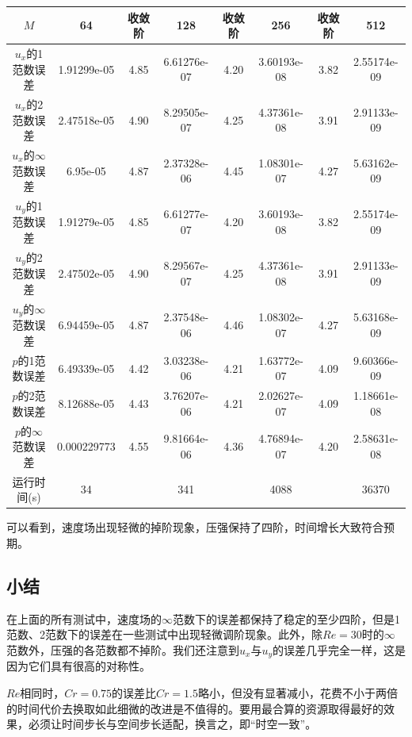 \documentclass[lang=cn,10pt,bibend=bibtex]{elegantbook}
\begin{document}
\begin{table}[H]
  \centering
  \small
  \begin{tabular}{c|ccccccc}
  \textbf{$M$}              & 64          & 收敛阶 & 128         & 收敛阶 & 256         & 收敛阶 & 512   \\ \hline
  $u_x$的1范数误差 & 1.91299e-05 & 4.85 & 6.61276e-07 & 4.20 & 3.60193e-08 & 3.82 & 2.55174e-09\\
  $u_x$的2范数误差 & 2.47518e-05 & 4.90 & 8.29505e-07 & 4.25 & 4.37361e-08 & 3.91 & 2.91133e-09\\
  $u_x$的$\infty$范数误差 & 6.95e-05 & 4.87 & 2.37328e-06 & 4.45 & 1.08301e-07 & 4.27 & 5.63162e-09\\
  $u_y$的1范数误差 & 1.91279e-05 & 4.85 & 6.61277e-07 & 4.20 & 3.60193e-08 & 3.82 & 2.55174e-09\\
  $u_y$的2范数误差 & 2.47502e-05 & 4.90 & 8.29567e-07 & 4.25 & 4.37361e-08 & 3.91 & 2.91133e-09\\
  $u_y$的$\infty$范数误差 & 6.94459e-05 & 4.87 & 2.37548e-06 & 4.46 & 1.08302e-07 & 4.27 & 5.63168e-09\\
  $p$的1范数误差 & 6.49339e-05 & 4.42 & 3.03238e-06 & 4.21 & 1.63772e-07 & 4.09 & 9.60366e-09\\
  $p$的2范数误差 & 8.12688e-05 & 4.43 & 3.76207e-06 & 4.21 & 2.02627e-07 & 4.09 & 1.18661e-08\\
  $p$的$\infty$范数误差 & 0.000229773 & 4.55 & 9.81664e-06 & 4.36 & 4.76894e-07 & 4.20 & 2.58631e-08\\  
  运行时间(s)                &       34     &       &     341      &       &     4088     &       &  36370
  \end{tabular}
\end{table}

可以看到，速度场出现轻微的掉阶现象，压强保持了四阶，时间增长大致符合预期。

\subsection{小结}

在上面的所有测试中，速度场的$\infty$范数下的误差都保持了稳定的至少四阶，但是1范数、2范数下的误差在一些测试中出现轻微调阶现象。此外，除$Re=30$时的$\infty$范数外，压强的各范数都不掉阶。我们还注意到$u_x$与$u_y$的误差几乎完全一样，这是因为它们具有很高的对称性。

$Re$相同时，$Cr=0.75$的误差比$Cr=1.5$略小，但没有显著减小，花费不小于两倍的时间代价去换取如此细微的改进是不值得的。要用最合算的资源取得最好的效果，必须让时间步长与空间步长适配，换言之，即“时空一致”。
\end{document}

